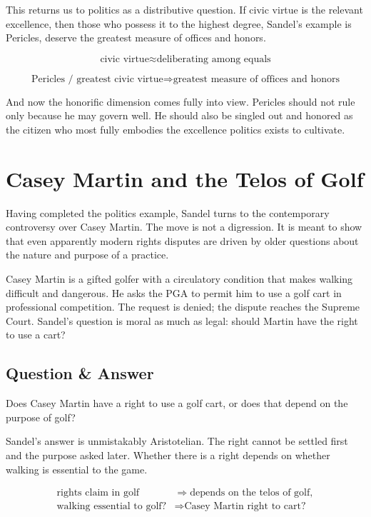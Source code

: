 This returns us to politics as a distributive question. If civic virtue is the relevant excellence, then those who possess it to the highest degree, Sandel's example is Pericles, deserve the greatest measure of offices and honors.

\begin{equation}
\text{civic virtue}
\approx
\text{deliberating among equals}
\end{equation}

\begin{equation}
\text{Pericles / greatest civic virtue}
\Longrightarrow
\text{greatest measure of offices and honors}
\end{equation}

And now the honorific dimension comes fully into view. Pericles should not rule only because he may govern well. He should also be singled out and honored as the citizen who most fully embodies the excellence politics exists to cultivate.

\section{Casey Martin and the Telos of Golf}

Having completed the politics example, Sandel turns to the contemporary controversy over Casey Martin. The move is not a digression. It is meant to show that even apparently modern rights disputes are driven by older questions about the nature and purpose of a practice.

Casey Martin is a gifted golfer with a circulatory condition that makes walking difficult and dangerous. He asks the PGA to permit him to use a golf cart in professional competition. The request is denied; the dispute reaches the Supreme Court. Sandel's question is moral as much as legal: should Martin have the right to use a cart?

\subsection{Question \& Answer}

Does Casey Martin have a right to use a golf cart, or does that depend on the purpose of golf?

Sandel's answer is unmistakably Aristotelian. The right cannot be settled first and the purpose asked later. Whether there is a right depends on whether walking is essential to the game.

\begin{align}
\text{rights claim in golf}
&\Longrightarrow
\text{depends on the telos of golf},\\
\text{walking essential to golf?}
&\Longrightarrow
\text{Casey Martin right to cart?}
\end{align}

